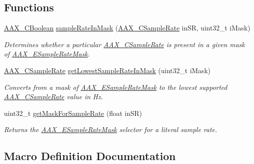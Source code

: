 \subsection*{Functions}
\begin{DoxyCompactItemize}
\item 
\hyperlink{a00149_aa216506530f1d19a2965931ced2b274b}{A\+A\+X\+\_\+\+C\+Boolean} \hyperlink{a00149_adec37d03995016a9e25490d5785f0d8b}{sample\+Rate\+In\+Mask} (\hyperlink{a00149_a3d9eea08f47e0b0a23432e15baa4e885}{A\+A\+X\+\_\+\+C\+Sample\+Rate} in\+S\+R, uint32\+\_\+t i\+Mask)
\begin{DoxyCompactList}\small\item\em Determines whether a particular \hyperlink{a00149_a3d9eea08f47e0b0a23432e15baa4e885}{A\+A\+X\+\_\+\+C\+Sample\+Rate} is present in a given mask of \hyperlink{a00206_a5bb98259de21d2c4d04a2d6010d757c7}{A\+A\+X\+\_\+\+E\+Sample\+Rate\+Mask}. \end{DoxyCompactList}\item 
\hyperlink{a00149_a3d9eea08f47e0b0a23432e15baa4e885}{A\+A\+X\+\_\+\+C\+Sample\+Rate} \hyperlink{a00149_a7ed6789141267c2270b49ef9a38bd55a}{get\+Lowest\+Sample\+Rate\+In\+Mask} (uint32\+\_\+t i\+Mask)
\begin{DoxyCompactList}\small\item\em Converts from a mask of \hyperlink{a00206_a5bb98259de21d2c4d04a2d6010d757c7}{A\+A\+X\+\_\+\+E\+Sample\+Rate\+Mask} to the lowest supported \hyperlink{a00149_a3d9eea08f47e0b0a23432e15baa4e885}{A\+A\+X\+\_\+\+C\+Sample\+Rate} value in Hz. \end{DoxyCompactList}\item 
uint32\+\_\+t \hyperlink{a00149_a35608eb248567091abba77878fb87eab}{get\+Mask\+For\+Sample\+Rate} (float in\+S\+R)
\begin{DoxyCompactList}\small\item\em Returns the \hyperlink{a00206_a5bb98259de21d2c4d04a2d6010d757c7}{A\+A\+X\+\_\+\+E\+Sample\+Rate\+Mask} selector for a literal sample rate. \end{DoxyCompactList}\end{DoxyCompactItemize}


\subsection{Macro Definition Documentation}
\hypertarget{a00149_a5f58f7770d463d262cc28b0e7b88747b}{}
